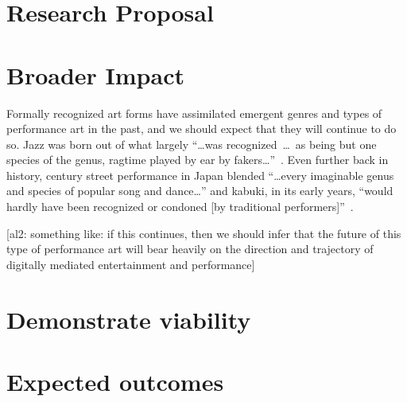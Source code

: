 \documentclass[10pt]{article}
\newcommand{\ali}[1]{{\color{Red}[al2: #1]}}
\newcommand{\topic}[1]{{\color{Blue}#1}}
\begin{document}

\section*{Research Proposal}

\section*{Broader Impact}
\topic{Formally recognized art forms have assimilated emergent genres and types of performance art in the past, and
we should expect that they will continue to do so.}
Jazz was born out of what largely ``\dots was recognized~\dots~as being but one species of the genus, ragtime played by ear by fakers\dots''~\cite{10.2307/779456}.
Even further back in history,  century street performance in Japan blended ``\dots every imaginable genus and species of popular song and dance\dots'' and
kabuki, in its early years,
``would hardly have been recognized or condoned [by traditional performers]''~\cite{groemer2016street}.

\ali{something like: if this continues, then we should infer that
     the future of this type of performance art will bear heavily on
     the direction and trajectory of digitally mediated entertainment and performance}

\section*{Demonstrate viability}

\section*{Expected outcomes}
\end{document}
